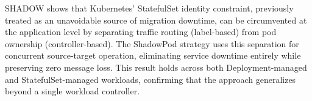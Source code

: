 \documentclass[conference]{IEEEtran}
\begin{document}
%
%
%
SHADOW shows that Kubernetes' StatefulSet identity constraint, previously
treated as an unavoidable source of migration downtime, can be circumvented at the
application level by separating traffic routing (label-based) from pod ownership
(controller-based). The ShadowPod strategy uses this separation for
concurrent source-target operation,
eliminating service downtime entirely while preserving zero message loss. This
result holds across both Deployment-managed and StatefulSet-managed workloads,
confirming that the approach generalizes beyond a single workload controller.
\end{document}
